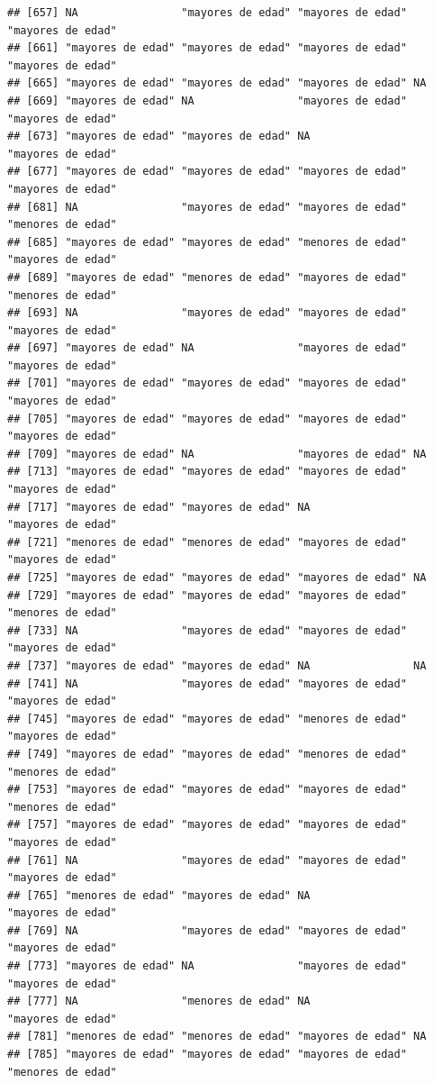 \documentclass[11pt,]{book}
\begin{document}
\begin{verbatim}
## [657] NA                "mayores de edad" "mayores de edad" "mayores de edad"
## [661] "mayores de edad" "mayores de edad" "mayores de edad" "mayores de edad"
## [665] "mayores de edad" "mayores de edad" "mayores de edad" NA               
## [669] "mayores de edad" NA                "mayores de edad" "mayores de edad"
## [673] "mayores de edad" "mayores de edad" NA                "mayores de edad"
## [677] "mayores de edad" "mayores de edad" "mayores de edad" "mayores de edad"
## [681] NA                "mayores de edad" "mayores de edad" "menores de edad"
## [685] "mayores de edad" "mayores de edad" "menores de edad" "mayores de edad"
## [689] "mayores de edad" "menores de edad" "mayores de edad" "menores de edad"
## [693] NA                "mayores de edad" "mayores de edad" "mayores de edad"
## [697] "mayores de edad" NA                "mayores de edad" "mayores de edad"
## [701] "mayores de edad" "mayores de edad" "mayores de edad" "mayores de edad"
## [705] "mayores de edad" "mayores de edad" "mayores de edad" "mayores de edad"
## [709] "mayores de edad" NA                "mayores de edad" NA               
## [713] "mayores de edad" "mayores de edad" "mayores de edad" "mayores de edad"
## [717] "mayores de edad" "mayores de edad" NA                "mayores de edad"
## [721] "menores de edad" "menores de edad" "mayores de edad" "mayores de edad"
## [725] "mayores de edad" "mayores de edad" "mayores de edad" NA               
## [729] "mayores de edad" "mayores de edad" "mayores de edad" "menores de edad"
## [733] NA                "mayores de edad" "mayores de edad" "mayores de edad"
## [737] "mayores de edad" "mayores de edad" NA                NA               
## [741] NA                "mayores de edad" "mayores de edad" "mayores de edad"
## [745] "mayores de edad" "mayores de edad" "menores de edad" "mayores de edad"
## [749] "mayores de edad" "mayores de edad" "menores de edad" "menores de edad"
## [753] "mayores de edad" "mayores de edad" "mayores de edad" "menores de edad"
## [757] "mayores de edad" "mayores de edad" "mayores de edad" "mayores de edad"
## [761] NA                "mayores de edad" "mayores de edad" "mayores de edad"
## [765] "menores de edad" "mayores de edad" NA                "mayores de edad"
## [769] NA                "mayores de edad" "mayores de edad" "mayores de edad"
## [773] "mayores de edad" NA                "mayores de edad" "mayores de edad"
## [777] NA                "menores de edad" NA                "mayores de edad"
## [781] "menores de edad" "menores de edad" "mayores de edad" NA               
## [785] "mayores de edad" "mayores de edad" "mayores de edad" "menores de edad"

\end{verbatim}
\end{document}
